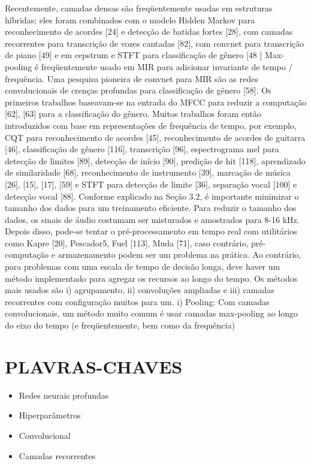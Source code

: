 \documentclass{article}
\begin{document}
Recentemente, camadas densas são freqüentemente usadas em estruturas híbridas; eles foram combinados com o modelo Hidden Markov para reconhecimento de acordes [24] e detecção de batidas fortes [28], com camadas recorrentes para transcrição de vozes cantadas [82], com convnet para transcrição de piano [49] e em cepstrum e STFT para classificação de gênero [48 ]
Max-pooling é freqüentemente usado em MIR para adicionar invariante de tempo / frequência.
Uma pesquisa pioneira de convnet para MIR são as redes convolucionais de crenças profundas para classificação de gênero [58]. Os primeiros trabalhos baseavam-se na entrada do MFCC para reduzir a computação [62], [63] para a classificação do gênero. Muitos trabalhos foram então introduzidos com base em representações de frequência de tempo, por exemplo, CQT para reconhecimento de acordes [45], reconhecimento de acordes de guitarra [46], classificação de gênero [116], transcrição [96], espectrograma mel para detecção de limites [89], detecção de início [90], predição de hit [118], aprendizado de similaridade [68], reconhecimento de instrumento [39], marcação de música [26], [15], [17], [59] e STFT para detecção de limite [36], separação vocal [100] e detecção vocal [88].
Conforme explicado na Seção 3.2, é importante minimizar o tamanho dos dados para um treinamento eficiente. Para reduzir o tamanho dos dados, os sinais de áudio costumam ser misturados e amostrados para 8-16 kHz. Depois disso, pode-se tentar o pré-processamento em tempo real com utilitários como Kapre [20], Pescador5, Fuel [113], Muda [71], caso contrário, pré-computação e armazenamento podem ser um problema na prática.
Ao contrário, para problemas com uma escala de tempo de decisão longa, deve haver um método implementado para agregar os recursos ao longo do tempo.
Os métodos mais usados ​​são
i) agrupamento, ii) convoluções ampliadas e iii) camadas recorrentes com configuração muitos para um. i) Pooling: Com camadas convolucionais, um método muito comum é usar camadas max-pooling ao longo do eixo do tempo (e freqüentemente, bem como da frequência)
\section{PLAVRAS-CHAVES}
\begin{itemize}
    \item Redes neurais profundas
    \item Hiperparâmetros
    \item Convolucional
    \item Camadas recorrentes
\end{itemize}
\end{document}
